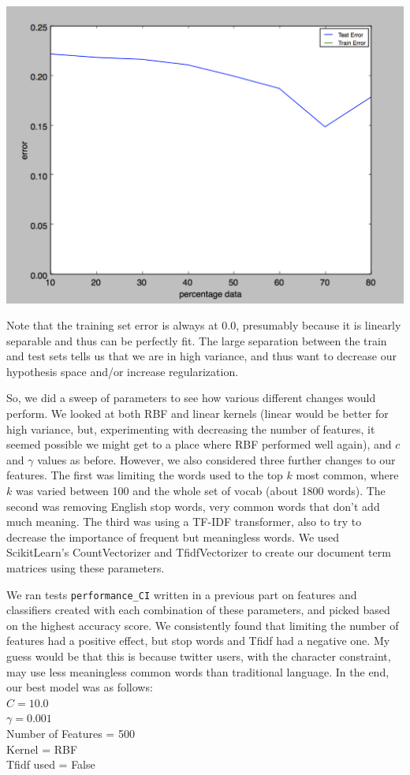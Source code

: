 \documentclass[11pt]{article}
\begin{document}
\begin{enumerate}
\includegraphics[scale=0.7]{learningcurve}

Note that the training set error is always at 0.0, presumably because it is linearly separable and thus can be 
perfectly fit. The large separation between the train and test sets tells us that we are in high variance, and 
thus want to decrease our hypothesis space and/or increase regularization.

So, we did a sweep of parameters to see how various different changes would perform. We looked at 
both RBF and linear kernels (linear would be better for high variance, but, experimenting with decreasing the number of features, it seemed possible we might get to a place where RBF performed well again), and $c$
and $\gamma$ values as before. However, we also considered three further changes to our features. The 
first was limiting the words used to the top $k$ most common, where $k$ was varied between 100 and the whole
set of vocab (about 1800 words). The second was removing English stop words, very common words that don't add much meaning. The third was using a TF-IDF transformer, also to try to decrease the importance of frequent but meaningless words. We used ScikitLearn's CountVectorizer and TfidfVectorizer to create our document term matrices using these parameters. 

We ran tests \texttt{performance\_CI} written in a previous part on features and classifiers created with each combination of these parameters, and picked based on the highest accuracy score. We consistently found that limiting the number of features had a positive effect, but stop words and Tfidf had a negative one. My guess would be that this is because twitter users, with the character constraint, may use less meaningless common words than traditional language. In the end, our best model was as follows:
\\$C=10.0$
\\$\gamma = 0.001$
\\Number of Features = 500
\\Kernel = RBF
\\ Tfidf used = False


\end{enumerate}
\end{document}
